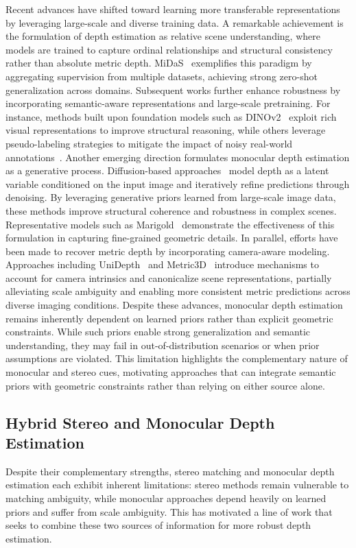 Recent advances have shifted toward learning more transferable representations by leveraging large-scale and diverse training data.
A remarkable achievement is the formulation of depth estimation as relative scene understanding, where models are trained to capture ordinal relationships and structural consistency rather than absolute metric depth.
MiDaS~\cite{ranftl2021vision} exemplifies this paradigm by aggregating supervision from multiple datasets, achieving strong zero-shot generalization across domains.
Subsequent works further enhance robustness by incorporating semantic-aware representations and large-scale pretraining.
For instance, methods built upon foundation models such as DINOv2~\cite{oquab2023dinov2} exploit rich visual representations to improve structural reasoning, while others leverage pseudo-labeling strategies to mitigate the impact of noisy real-world annotations~\cite{yang2024depth,depth_anything_v1}.
Another emerging direction formulates monocular depth estimation as a generative process.
Diffusion-based approaches~\cite{ke2023repurposing,fu2024geowizard,he2024lotus} model depth as a latent variable conditioned on the input image and iteratively refine predictions through denoising.
By leveraging generative priors learned from large-scale image data, these methods improve structural coherence and robustness in complex scenes.
Representative models such as Marigold~\cite{ke2023repurposing} demonstrate the effectiveness of this formulation in capturing fine-grained geometric details.
In parallel, efforts have been made to recover metric depth by incorporating camera-aware modeling.
Approaches including UniDepth~\cite{piccinelli2024unidepth} and Metric3D~\cite{yin2023metric3d,bochkovskii2024depth} introduce mechanisms to account for camera intrinsics and canonicalize scene representations, partially alleviating scale ambiguity and enabling more consistent metric predictions across diverse imaging conditions.
Despite these advances, monocular depth estimation remains inherently dependent on learned priors rather than explicit geometric constraints.
While such priors enable strong generalization and semantic understanding, they may fail in out-of-distribution scenarios or when prior assumptions are violated.
This limitation highlights the complementary nature of monocular and stereo cues, motivating approaches that can integrate semantic priors with geometric constraints rather than relying on either source alone.

\subsection{Hybrid Stereo and Monocular Depth Estimation}
Despite their complementary strengths, stereo matching and monocular depth estimation each exhibit inherent limitations: stereo methods remain vulnerable to matching ambiguity, while monocular approaches depend heavily on learned priors and suffer from scale ambiguity.
This has motivated a line of work that seeks to combine these two sources of information for more robust depth estimation.

